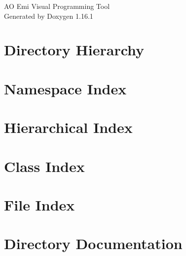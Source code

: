 \documentclass[twoside]{book}
\newcommand{\+}{\discretionary{\mbox{\scriptsize$\hookleftarrow$}}{}{}}
\newcommand{\clearemptydoublepage}{%
    \newpage{\pagestyle{empty}\cleardoublepage}%
  }
\begin{document}
  \raggedbottom
    \hypersetup{pageanchor=false,
                bookmarksnumbered=true,
                pdfencoding=unicode
               }
  \begin{titlepage}
  \vspace*{7cm}
  \begin{center}%
  {\Large AO Emi Visual Programming Tool}\\
  \vspace*{1cm}
  {\large Generated by Doxygen 1.16.1}\\
  \end{center}
  \end{titlepage}
  \clearemptydoublepage
  \tableofcontents
  \clearemptydoublepage
  \hypersetup{pageanchor=true}


\chapter{Directory Hierarchy}

\chapter{Namespace Index}

\chapter{Hierarchical Index}

\chapter{Class Index}

\chapter{File Index}

\chapter{Directory Documentation}












\end{document}
